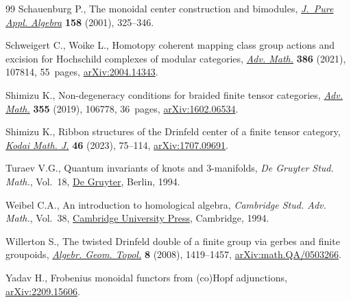\begin{thebibliography}{99}
Schauenburg P., The monoidal center construction and bimodules, \href{https://doi.org/10.1016/S0022-4049(00)00040-2}{\textit{J.~Pure
 Appl. Algebra}} \textbf{158} (2001), 325--346.

Schweigert C., Woike L., Homotopy coherent mapping class group actions and
 excision for {H}ochschild complexes of modular categories, \href{https://doi.org/10.1016/j.aim.2021.107814}{\textit{Adv.
 Math.}} \textbf{386} (2021), 107814, 55~pages, \href{https://arxiv.org/abs/2004.14343}{arXiv:2004.14343}.

Shimizu K., Non-degeneracy conditions for braided finite tensor categories,
 \href{https://doi.org/10.1016/j.aim.2019.106778}{\textit{Adv. Math.}} \textbf{355} (2019), 106778, 36~pages,
 \href{https://arxiv.org/abs/1602.06534}{arXiv:1602.06534}.

Shimizu K., Ribbon structures of the {D}rinfeld center of a finite tensor
 category, \href{https://doi.org/10.2996/kmj46106}{\textit{Kodai Math. J.}} \textbf{46} (2023), 75--114,
 \href{https://arxiv.org/abs/1707.09691}{arXiv:1707.09691}.

Turaev V.G., Quantum invariants of knots and 3-manifolds, \textit{{D}e Gruyter
 Stud. Math.}, Vol.~18, \href{https://doi.org/10.1515/9783110435221}{{D}e Gruyter}, Berlin, 1994.

Weibel C.A., An introduction to homological algebra, \textit{Cambridge Stud.
 Adv. Math.}, Vol.~38, \href{https://doi.org/10.1017/CBO9781139644136}{Cambridge University Press}, Cambridge, 1994.

Willerton S., The twisted {D}rinfeld double of a finite group via gerbes and
 finite groupoids, \href{https://doi.org/10.2140/agt.2008.8.1419}{\textit{Algebr. Geom. Topol.}} \textbf{8} (2008),
 1419--1457, \href{https://arxiv.org/abs/math.QA/0503266}{arXiv:math.QA/0503266}.

Yadav H., Frobenius monoidal functors from (co){H}opf adjunctions,
 \href{https://arxiv.org/abs/2209.15606}{arXiv:2209.15606}.

\end{thebibliography}
